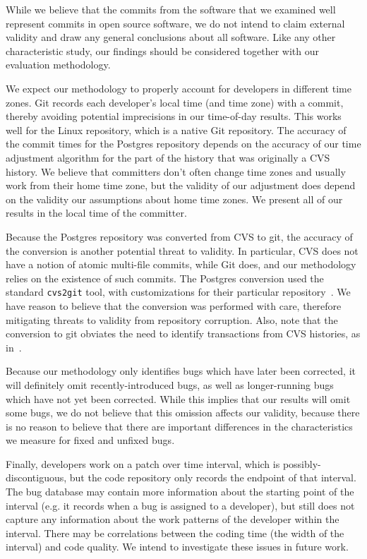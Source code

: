 While we believe that the commits from the software that we examined
well represent commits in open source software, we do not intend to
claim external validity and draw any general conclusions about all
software.  Like any other characteristic study, our findings should be
considered together with our evaluation methodology.

We expect our methodology to properly account for developers in
different time zones. Git records each developer's local time (and
time zone) with a commit, thereby avoiding potential imprecisions in
our time-of-day results. This works well for the Linux repository,
which is a native Git repository. The accuracy of the commit times for
the Postgres repository depends on the accuracy of our time adjustment
algorithm for the part of the history that was originally a CVS
history. We believe that committers don't often change time zones and
usually work from their home time zone, but the validity of our
adjustment does depend on the validity our assumptions about home time
zones. We present all of our results in the local
time of the committer.

Because the Postgres repository was converted from CVS to git, the
accuracy of the conversion is another potential threat to validity.  In
particular, CVS does not have a notion of atomic multi-file commits,
while Git does, and our methodology relies on the existence of such
commits. The Postgres conversion used the standard {\tt cvs2git} tool,
with customizations for their particular
repository~\cite{haas09:_so_why_postg_using_git}. We have reason to
believe that the conversion was performed with care, therefore
mitigating threats to validity from repository corruption. Also, note
that the conversion to git obviates the need to identify transactions
from CVS histories, as in~\cite{zimmermann-msr-2004}.


Because our methodology only identifies bugs which have later been
corrected, it will definitely omit recently-introduced bugs, as well
as longer-running bugs which have not yet been corrected. While this
implies that our results will omit some bugs, we do not believe that
this omission affects our validity, because there is no reason to
believe that there are important differences in the characteristics we
measure for fixed and unfixed bugs.

Finally, developers work on a patch over time interval, which is
possibly-discontiguous, but the code repository only records the
endpoint of that interval. The bug database may contain more
information about the starting point of the interval (e.g. it records
when a bug is assigned to a developer), but still does not capture any
information about the work patterns of the developer within the
interval. There may be correlations between the coding time (the width
of the interval) and code quality. We intend to investigate these
issues in future work.
